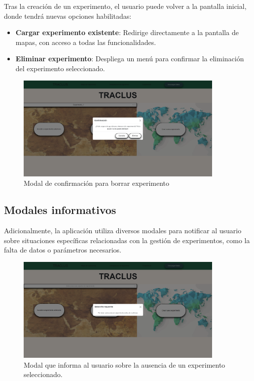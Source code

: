 Tras la creación de un experimento, el usuario puede volver a la pantalla inicial, donde tendrá nuevas opciones habilitadas:

\begin{itemize}
    \item \textbf{Cargar experimento existente}: Redirige directamente a la pantalla de mapas, con acceso a todas las funcionalidades.
    \item \textbf{Eliminar experimento}: Despliega un menú para confirmar la eliminación del experimento seleccionado.
\end{itemize}

\begin{figure}[H]
    \centering
    \includegraphics[width=0.9\textwidth]{img/webpage/Delete.png}
    \caption{Modal de confirmación para borrar experimento}
\end{figure}

\subsection{Modales informativos}

Adicionalmente, la aplicación utiliza diversos modales para notificar al usuario sobre situaciones específicas relacionadas con la gestión de experimentos, como la falta de datos o parámetros necesarios.

\begin{figure}[H]
    \centering
    \includegraphics[width=0.9\textwidth]{img/webpage/Modal_1.png}
    \caption{Modal que informa al usuario sobre la ausencia de un experimento seleccionado.}
\end{figure}

